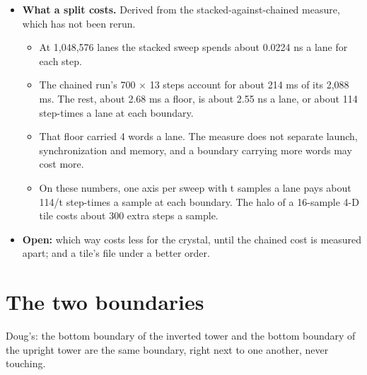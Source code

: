 \begin{itemize}
\begin{itemize}
\item One level of the whole grid costs 7.5 steps a sample for each axis plus one field step: 8.5, 16, 23.5 and 31 in 1 to 4 axes. The replica's grids add one constant for each line.
\item A tile recomputes its halo. In 4-D a 16-sample tile runs 331 steps a sample against the grid's 31.
\item In this order a tile's file passes 256 limbs at 512 samples in 3-D and 256 samples in 4-D.
\end{itemize}
\item \textbf{What a split costs.} Derived from the stacked-against-chained measure, which has not been rerun.

\begin{itemize}
\item At 1,048,576 lanes the stacked sweep spends about 0.0224 ns a lane for each step.
\item The chained run's 700 × 13 steps account for about 214 ms of its 2,088 ms. The rest, about 2.68 ms a floor, is about 2.55 ns a lane, or about 114 step-times a lane at each boundary.
\item That floor carried 4 words a lane. The measure does not separate launch, synchronization and memory, and a boundary carrying more words may cost more.
\item On these numbers, one axis per sweep with t samples a lane pays about 114/t step-times a sample at each boundary. The halo of a 16-sample 4-D tile costs about 300 extra steps a sample.
\end{itemize}
\item \textbf{Open:} which way costs less for the crystal, until the chained cost is measured apart; and a tile's file under a better order.
\end{itemize}

\section{\texorpdfstring{The two boundaries}{The two boundaries}}

Doug's: the bottom boundary of the inverted tower and the bottom boundary of the upright tower are the same boundary, right next to one another, never touching.

